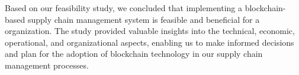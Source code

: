 \noindent Based on our feasibility study, we concluded that implementing a blockchain-based supply chain management system is feasible and beneficial for a organization. The study provided valuable insights into the technical, economic, operational, and organizational aspects, enabling us to make informed decisions and plan for the adoption of blockchain technology in our supply chain management processes.







